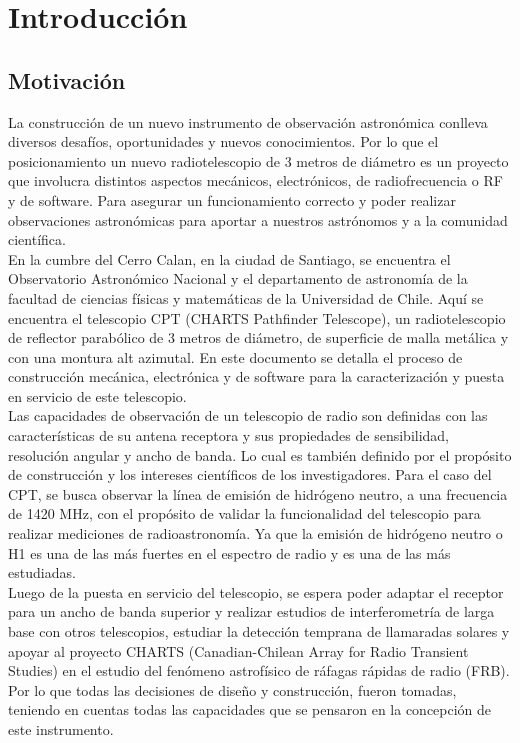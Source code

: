 \chapter{Introducción}
\section{Motivación}

La construcción de un nuevo instrumento de observación astronómica conlleva diversos desafíos, oportunidades y nuevos conocimientos. Por lo que el posicionamiento un nuevo radiotelescopio de 3 metros de diámetro es un proyecto que involucra distintos aspectos mecánicos, electrónicos, de radiofrecuencia o RF y de software. Para asegurar un funcionamiento correcto y poder realizar observaciones astronómicas para aportar a nuestros astrónomos y a la comunidad científica.\\

En la cumbre del Cerro Calan, en la ciudad de Santiago, se encuentra el Observatorio Astronómico Nacional y el departamento de astronomía de la facultad de ciencias físicas y matemáticas de la Universidad de Chile. Aquí se encuentra el telescopio CPT (CHARTS Pathfinder Telescope), un radiotelescopio de reflector parabólico de 3 metros de diámetro, de superficie de malla metálica y con una montura alt azimutal. En este documento se detalla el proceso de construcción mecánica, electrónica y de software para la caracterización y puesta en servicio de este telescopio.\\ 

Las capacidades de observación de un telescopio de radio son definidas con las características de su antena receptora y sus propiedades de sensibilidad, resolución angular y ancho de banda. Lo cual es también definido por el propósito de construcción y los intereses científicos de los investigadores. Para el caso del CPT, se busca observar la línea de emisión de hidrógeno neutro, a una frecuencia de 1420 MHz, con el propósito de validar la funcionalidad del telescopio para realizar mediciones de radioastronomía. Ya que la emisión de hidrógeno neutro o H1 es una de las más fuertes en el espectro de radio y es una de las más estudiadas.\\

Luego de la puesta en servicio del telescopio, se espera poder adaptar el receptor para un ancho de banda superior y realizar estudios de interferometría de larga base con otros telescopios, estudiar la detección temprana de llamaradas solares y apoyar al proyecto CHARTS (Canadian-Chilean Array for Radio Transient Studies) en el estudio del fenómeno astrofísico de ráfagas rápidas de radio (FRB). Por lo que todas las decisiones de diseño y construcción, fueron tomadas, teniendo en cuentas todas las capacidades que se pensaron en la concepción de este instrumento.\\


